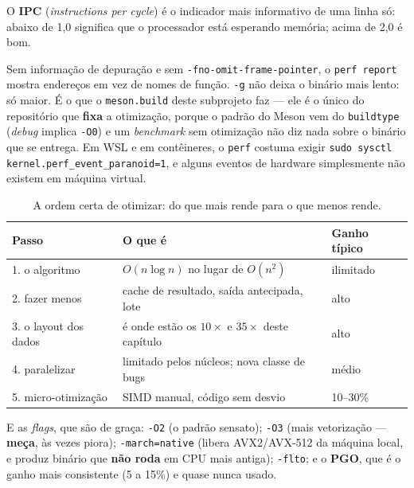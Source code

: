 O \textbf{IPC} (\emph{instructions per cycle}) é o indicador mais informativo de
uma linha só: abaixo de 1,0 significa que o processador está esperando memória;
acima de 2,0 é bom.

\begin{armadilha}
Sem informação de depuração e sem \texttt{-fno-omit-frame-pointer}, o
\texttt{perf report} mostra endereços em vez de nomes de função. \texttt{-g} não
deixa o binário mais lento: só maior. É o que o \texttt{meson.build} deste
subprojeto faz --- ele é o único do repositório que \textbf{fixa} a otimização,
porque o padrão do Meson vem do \texttt{buildtype} (\emph{debug} implica
\texttt{-O0}) e um \emph{benchmark} sem otimização não diz nada sobre o binário
que se entrega. Em WSL e em contêineres, o \texttt{perf} costuma exigir
\texttt{sudo sysctl kernel.perf\_event\_paranoid=1}, e alguns eventos de hardware
simplesmente não existem em máquina virtual.
\end{armadilha}

\begin{table}[htbp]
\centering
\caption{A ordem certa de otimizar: do que mais rende para o que menos rende.}
\label{tab:ordem-otimizar}
\footnotesize
\begin{tabular}{@{}lll@{}}
\toprule
\textbf{Passo} & \textbf{O que é} & \textbf{Ganho típico} \\
\midrule
1. o algoritmo        & $O(n \log n)$ no lugar de $O(n^2)$ & ilimitado \\
2. fazer menos        & cache de resultado, saída antecipada, lote & alto \\
3. o layout dos dados & é onde estão os $10\times$ e $35\times$ deste capítulo & alto \\
4. paralelizar        & limitado pelos núcleos; nova classe de bugs & médio \\
5. micro-otimização   & SIMD manual, código sem desvio & 10--30\% \\
\bottomrule
\end{tabular}
\end{table}

E as \emph{flags}, que são de graça: \texttt{-O2} (o padrão sensato);
\texttt{-O3} (mais vetorização --- \textbf{meça}, às vezes piora);
\texttt{-march=native} (libera AVX2/AVX-512 da máquina local, e produz binário que
\textbf{não roda} em CPU mais antiga); \texttt{-flto}; e o \textbf{PGO}, que é o
ganho mais consistente (5 a 15\%) e quase nunca usado.


